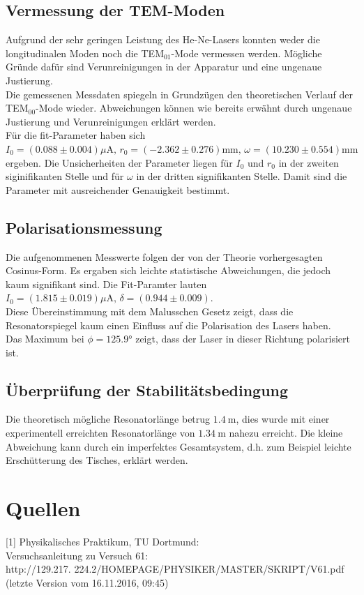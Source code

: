 \documentclass[captions=tableheading]{scrartcl}
\begin{document}
\subsection{Vermessung der TEM-Moden}
Aufgrund der sehr geringen Leistung des He-Ne-Lasers konnten weder die longitudinalen Moden noch die TEM$_{01}$-Mode vermessen werden. Mögliche Gründe dafür sind Verunreinigungen in der Apparatur und eine ungenaue Justierung. \\
Die gemessenen Messdaten spiegeln in Grundzügen den theoretischen Verlauf der TEM$_{00}$-Mode wieder. Abweichungen können wie bereits erwähnt durch ungenaue Justierung und Verunreinigungen erklärt werden. \\
Für die fit-Parameter haben sich  $I_0= (0.088 \pm 0.004) \si{\mu\ampere},\,r_0= (-2.362 \pm 0.276) \si{\milli\metre},\,\omega=  (10.230  \pm 0.554) \si{\milli\metre}$ ergeben. Die Unsicherheiten der Parameter liegen für $I_0$ und $r_0$ in der zweiten siginifikanten Stelle und für $\omega$ in der dritten signifikanten Stelle. Damit sind die Parameter mit ausreichender Genauigkeit bestimmt.

\subsection{Polarisationsmessung}
Die aufgenommenen Messwerte folgen der von der Theorie vorhergesagten Cosinus-Form. Es ergaben sich leichte statistische Abweichungen, die jedoch kaum signifikant sind. Die Fit-Paramter lauten $I_0=(1.815 \pm 0.019)\si{\mu\ampere},\, \delta=(0.944 \pm 0.009)$. \\
Diese Übereinstimmung mit dem Malusschen Gesetz zeigt, dass die Resonatorspiegel kaum einen Einfluss auf die Polarisation des Lasers haben. \\
Das Maximum bei $\phi=\ang{125.9}$ zeigt, dass der Laser in dieser Richtung polarisiert ist.

\subsection{Überprüfung der Stabilitätsbedingung}
Die theoretisch mögliche Resonatorlänge betrug $\SI{1.4}{\metre}$, dies wurde mit einer experimentell erreichten Resonatorlänge von $\SI{1.34}{\metre}$ nahezu erreicht. Die kleine Abweichung kann durch ein imperfektes Gesamtsystem, d.h. zum Beispiel leichte Erschütterung des Tisches, erklärt werden.

\section{Quellen}
{[1]} Physikalisches Praktikum, TU Dortmund: \\
Versuchsanleitung zu Versuch 61: \\
http://129.217.
224.2/HOMEPAGE/PHYSIKER/MASTER/SKRIPT/V61.pdf (letzte Version vom 16.11.2016, 09:45)\\
\end{document}
